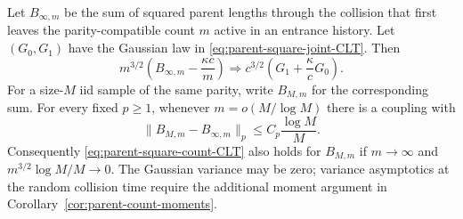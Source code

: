 \documentclass[11pt,letterpaper]{article}
\begin{document}
\begin{corollary}
\label{cor:parent-square-count-CLT}
Let $B_{\infty,m}$ be the sum of squared parent lengths through
the collision that first leaves the parity-compatible count
$m$ active in an entrance history. Let $(G_0,G_1)$ have the Gaussian law in
\eqref{eq:parent-square-joint-CLT}. Then
\begin{equation}\label{eq:parent-square-count-CLT}
 m^{3/2}\left(B_{\infty,m}-\frac{\kappa c}{m}\right)
       \Longrightarrow c^{3/2}
                         \left(G_1+\frac\kappa cG_0\right).
\end{equation}
For a size-$M$ iid sample of the same parity, write $B_{M,m}$
for the corresponding sum. For every fixed $p\ge1$, whenever
$m=o(M/\log M)$ there is a coupling with
\begin{equation}\label{eq:parent-square-count-coupling}
 \|B_{M,m}-B_{\infty,m}\|_p\le C_p\frac{\log M}{M}.
\end{equation}
Consequently \eqref{eq:parent-square-count-CLT} also holds for
$B_{M,m}$ if $m\to\infty$ and
$m^{3/2}\log M/M\to0$. The Gaussian variance may be zero;
variance asymptotics at the random collision time require the
additional moment argument in Corollary~\ref{cor:parent-count-moments}.
\end{corollary}
\end{document}
